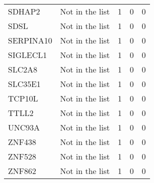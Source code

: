 \documentclass[12pt,twoside]{reedthesis}
\theoremstyle{definition}
\theoremstyle{definition}
\theoremstyle{remark}
\begin{document}
\begin{longtable}[t]{llrrr}
  \addlinespace
  SDHAP2 & Not in the list & 1 & 0 & 0\\
  SDSL & Not in the list & 1 & 0 & 0\\
  SERPINA10 & Not in the list & 1 & 0 & 0\\
  SIGLECL1 & Not in the list & 1 & 0 & 0\\
  SLC2A8 & Not in the list & 1 & 0 & 0\\
  \addlinespace
  SLC35E1 & Not in the list & 1 & 0 & 0\\
  TCP10L & Not in the list & 1 & 0 & 0\\
  TTLL2 & Not in the list & 1 & 0 & 0\\
  UNC93A & Not in the list & 1 & 0 & 0\\
  ZNF438 & Not in the list & 1 & 0 & 0\\
  \addlinespace
  ZNF528 & Not in the list & 1 & 0 & 0\\
  ZNF862 & Not in the list & 1 & 0 & 0\\
  \bottomrule
  \end{longtable}
  
  \newpage
  
\end{document}
